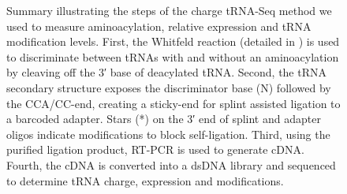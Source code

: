 \documentclass[9pt,lineno]{elife}
\begin{document}
\begin{figure}[ht!]
\centering
{}
\caption{
Summary illustrating the steps of the charge tRNA-Seq method we used to measure aminoacylation, relative expression and tRNA modification levels.
First, the Whitfeld reaction (detailed in ) is used to discriminate between tRNAs with and without an aminoacylation by cleaving off the 3′ base of deacylated tRNA.
Second, the tRNA secondary structure exposes the discriminator base (N) followed by the CCA/CC-end, creating a sticky-end for splint assisted ligation to a barcoded adapter.
Stars (*) on the 3′ end of splint and adapter oligos indicate modifications to block self-ligation.
Third, using the purified ligation product, RT-PCR is used to generate cDNA.
Fourth, the cDNA is converted into a dsDNA library and sequenced to determine tRNA charge, expression and modifications.
}
\label{fig:Fig1}

\label{figsupp:f1S1}
\end{figure}
\end{document}
